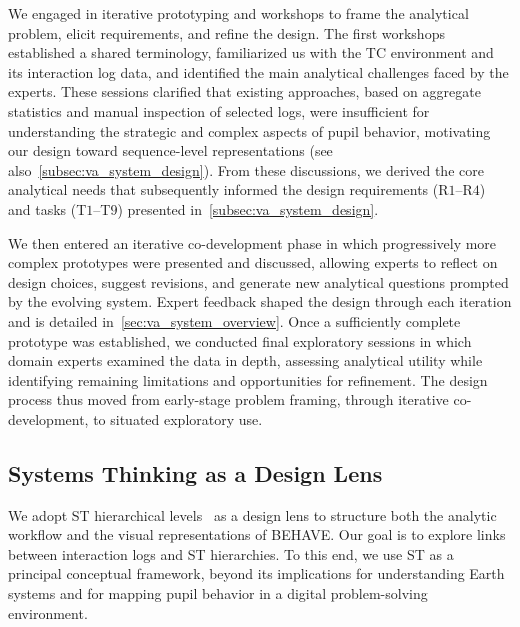 \documentclass[letterpaper,journal]{IEEEtran}
\begin{document}
We engaged in iterative prototyping and workshops to frame the analytical problem, elicit requirements, and refine the design.
The first workshops established a shared terminology, familiarized us with the TC environment and its interaction log data, and identified the main analytical challenges faced by the experts.
These sessions clarified that existing approaches, based on aggregate statistics and manual inspection of selected logs, were insufficient for understanding the strategic and complex aspects of pupil behavior, motivating our design toward sequence-level representations (see also~\cref{subsec:va_system_design}).
From these discussions, we derived the core analytical needs that subsequently informed the design requirements (R$1$--R$4$) and tasks (T$1$--T$9$) presented in~\cref{subsec:va_system_design}.

We then entered an iterative co-development phase in which progressively more complex prototypes were presented and discussed, allowing experts to reflect on design choices, suggest revisions, and generate new analytical questions prompted by the evolving system. 
Expert feedback shaped the design through each iteration and is detailed in~\cref{sec:va_system_overview}.
Once a sufficiently complete prototype was established, we conducted final exploratory sessions in which domain experts examined the data in depth, assessing analytical utility while identifying remaining limitations and opportunities for refinement. 
The design process thus moved from early-stage problem framing, through iterative co-development, to situated exploratory use.



\subsection{Systems Thinking as a Design Lens}

We adopt ST hierarchical levels~\cite{assaraf2005development} as a design lens to structure both the analytic workflow and the visual representations of \textsc{BEHAVE}. 
Our goal is to explore links between interaction logs and ST hierarchies. 
To this end, we use ST as a principal conceptual framework, beyond its implications for understanding Earth systems and for mapping pupil behavior in a digital problem-solving environment. 
\end{document}
